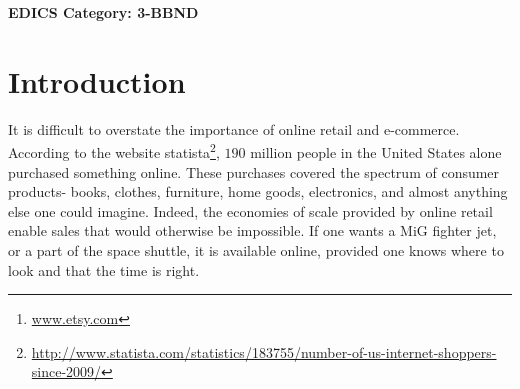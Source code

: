 \documentclass[conference,a4paper]{IEEEtran}
\begin{document}
\begin{abstract}
The online realm has become a driving force in the retail
marketplace. E-Commerce websites can provide a level of diversity and
uniqueness that is impossible in the world of brick-and-mortar
retail. Etsy is an online marketplace\footnote{\url{www.etsy.com}} for
artisans selling unique handcrafted goods, and vintage wares that
couldn't be found elsewhere. Etsy caters to the long tail of online retail~\cite{Anderson:2006}. 
 
Intuitively, online retail is a visual experience- shoppers have
particular styles that they find appealing; often images are used as
first order information when making shopping decisions. There are a
variety of signals extracted from the images representing those items
for sale by shoppers. Amongst these, color composition is an important
cue for visual search and image ranking- often shoppers have a palette
of favorite colors, or a mental image of what they're looking for,
partially determined by color. In this paper, we introduce a novel
dataset for user behaviour prediction. We address the problem of
inferring dominant color composition from the pixel-level color
distribution of listed images on Etsy.
 We explore the dominant colors of favorited listings and investigate the entropy of colors distribution among Etsy users.
\end{abstract}





\ifCLASSOPTIONpeerreview
 \begin{center} \bfseries EDICS Category: 3-BBND \end{center}
 \fi
%
\IEEEpeerreviewmaketitle



\section{Introduction}
It is difficult to overstate the importance of online retail and e-commerce. According to the website statista\footnote{\url{http://www.statista.com/statistics/183755/number-of-us-internet-shoppers-since-2009/}}, $190$ million people in the United States alone purchased something online. These purchases covered the spectrum of consumer products- books, clothes, furniture, home goods, electronics, and almost anything else one could imagine. Indeed, the economies of scale provided by online retail enable sales that would otherwise be impossible. If one wants a MiG fighter jet, or a part of the space shuttle, it is available online, provided one knows where to look and that the time is right. 
 
\end{document}
